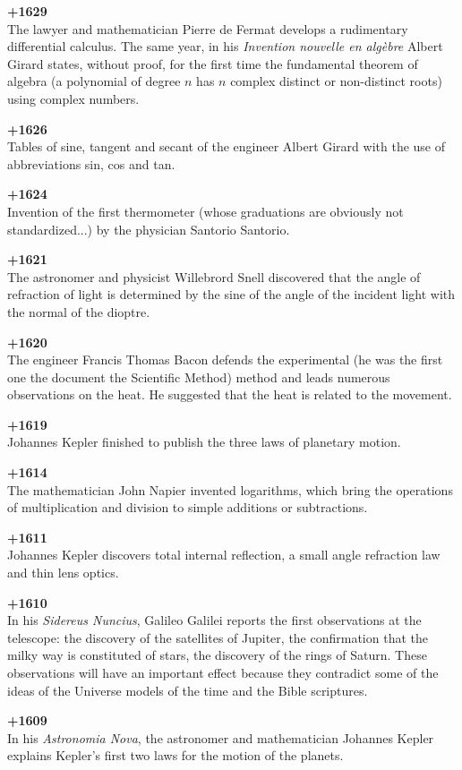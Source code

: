 \textbf{+1629}\\
The lawyer and mathematician Pierre de Fermat develops a rudimentary differential calculus. The same year, in his \textit{Invention nouvelle en algèbre} Albert Girard states, without proof, for the first time the fundamental theorem of algebra (a polynomial of degree $n$ has $n$ complex distinct or non-distinct roots) using complex numbers.

\textbf{+1626}\\
Tables of sine, tangent and secant of the engineer Albert Girard with the use of abbreviations sin, cos and tan.

\textbf{+1624}\\
Invention of the first thermometer (whose graduations are obviously not standardized...) by the physician Santorio Santorio.

\textbf{+1621}\\
The astronomer and physicist Willebrord Snell discovered that the angle of refraction of light is determined by the sine of the angle of the incident light with the normal of the dioptre.

\textbf{+1620}\\
The engineer Francis Thomas Bacon defends the experimental (he was the first one the document the Scientific Method) method and leads numerous observations on the heat. He suggested that the heat is related to the movement.

\textbf{+1619}\\
Johannes Kepler finished to publish the three laws of planetary motion.

\textbf{+1614}\\
The mathematician John Napier invented logarithms, which bring the operations of multiplication and division to simple additions or subtractions.

\textbf{+1611}\\
Johannes Kepler discovers total internal reflection, a small angle refraction law and thin lens optics.

\textbf{+1610}\\ In his \textit{Sidereus Nuncius}, Galileo Galilei reports the first observations at the telescope: the discovery of the satellites of Jupiter, the confirmation that the milky way is constituted of stars, the discovery of the rings of Saturn. These observations will have an important effect because they contradict some of the ideas of the Universe models of the time and the Bible scriptures.

\textbf{+1609}\\
In his \textit{Astronomia Nova}, the astronomer and mathematician Johannes Kepler explains Kepler's first two laws for the motion of the planets.

